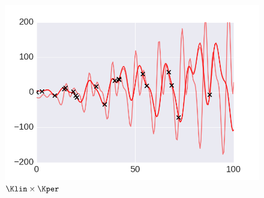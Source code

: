     \begin{subfigure}[b]{0.3\textwidth}
        \includegraphics[width=\textwidth]{figs/composition/composition_demo_LINxPER.png}
        \caption{$\Klin \times \Kper$}
    \end{subfigure}

